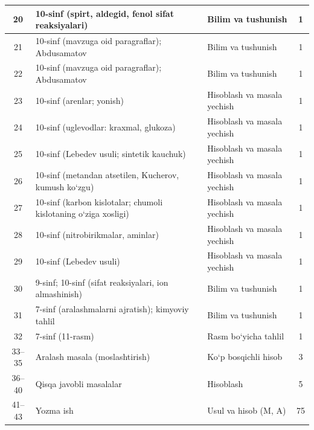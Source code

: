\documentclass[11pt,a4paper]{article}
\begin{document}
{\begin{longtable}{|c|p{7.2cm}|p{5.4cm}|c|}
20 & 10-sinf (spirt, aldegid, fenol sifat reaksiyalari) & Bilim va tushunish & 1\\\hline
21 & 10-sinf (mavzuga oid paragraflar); Abdusamatov & Bilim va tushunish & 1\\\hline
22 & 10-sinf (mavzuga oid paragraflar); Abdusamatov & Bilim va tushunish & 1\\\hline
23 & 10-sinf (arenlar; yonish) & Hisoblash va masala yechish & 1\\\hline
24 & 10-sinf (uglevodlar: kraxmal, glukoza) & Hisoblash va masala yechish & 1\\\hline
25 & 10-sinf (Lebedev usuli; sintetik kauchuk) & Hisoblash va masala yechish & 1\\\hline
26 & 10-sinf (metandan atsetilen, Kucherov, kumush ko`zgu) & Hisoblash va masala yechish & 1\\\hline
27 & 10-sinf (karbon kislotalar; chumoli kislotaning o`ziga xosligi) & Hisoblash va masala yechish & 1\\\hline
28 & 10-sinf (nitrobirikmalar, aminlar) & Hisoblash va masala yechish & 1\\\hline
29 & 10-sinf (Lebedev usuli) & Hisoblash va masala yechish & 1\\\hline
30 & 9-sinf; 10-sinf (sifat reaksiyalari, ion almashinish) & Bilim va tushunish & 1\\\hline
31 & 7-sinf (aralashmalarni ajratish); kimyoviy tahlil & Bilim va tushunish & 1\\\hline
32 & 7-sinf (11-rasm) & Rasm bo`yicha tahlil & 1\\\hline
33--35 & Aralash masala (moslashtirish) & Ko`p bosqichli hisob & 3\\\hline
36--40 & Qisqa javobli masalalar & Hisoblash & 5\\\hline
41--43 & Yozma ish & Usul va hisob (M, A) & 75\\\hline
\end{longtable}}
\end{document}
